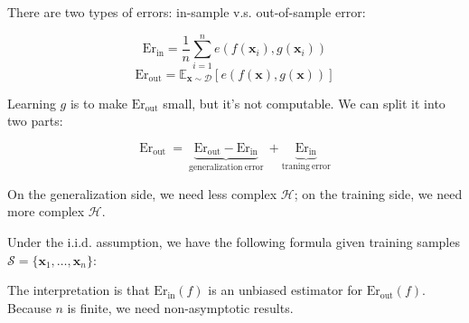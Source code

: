 \documentclass[10pt]{report}
\begin{document}
There are two types of errors: in-sample v.s. out-of-sample error:

\[\mathrm{Er}_{\mathrm{in}}=\frac1n\sum_{i=1}^ne(f(\boldsymbol{x}_i),g(\boldsymbol{x}_i))\]
\[\mathrm{Er}_{\mathrm{out}}=\mathbb{E}_{\boldsymbol{x}\sim\mathcal{D}}\left[e(f(\boldsymbol{x}),g(\boldsymbol{x}))\right]\]

Learning $g$ is to make $\mathrm{Er}_{\mathrm{out}}$ small, but it's not computable. We can split it into two parts:

$$
    \mathrm{Er_{out}~=~\underbrace{Er_{out}-Er_{in}}_{generalization~error}~+\underbrace{Er_{in}}_{traning~error}}
$$

On the generalization side, we need less complex $\mathcal{H}$; on the training side, we need more complex $\mathcal{H}$.


Under the i.i.d. assumption, we have the following formula given training samples $\mathcal{S}=\{\boldsymbol{x}_1,\ldots,\boldsymbol{x}_n\}$:



The interpretation is that $\mathrm{Er}_{\mathrm{in}}(f)$ is an unbiased estimator for $\mathrm{Er}_{\mathrm{out}}(f)$. Because $n$ is finite, we need non-asymptotic results.

\end{document}
